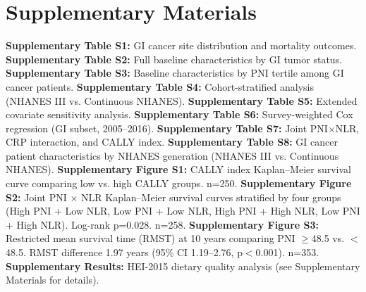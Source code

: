 \documentclass[review]{elsarticle}
\begin{document}
\section*{Supplementary Materials}

\textbf{Supplementary Table S1:} GI cancer site distribution and mortality outcomes.
\textbf{Supplementary Table S2:} Full baseline characteristics by GI tumor status.
\textbf{Supplementary Table S3:} Baseline characteristics by PNI tertile among GI cancer patients.
\textbf{Supplementary Table S4:} Cohort-stratified analysis (NHANES III vs. Continuous NHANES).
\textbf{Supplementary Table S5:} Extended covariate sensitivity analysis.
\textbf{Supplementary Table S6:} Survey-weighted Cox regression (GI subset, 2005--2016).
\textbf{Supplementary Table S7:} Joint PNI$\times$NLR, CRP interaction, and CALLY index.
\textbf{Supplementary Table S8:} GI cancer patient characteristics by NHANES generation (NHANES III vs. Continuous NHANES).
\textbf{Supplementary Figure S1:} CALLY index Kaplan--Meier survival curve comparing low vs. high CALLY groups. n=250.
\textbf{Supplementary Figure S2:} Joint PNI $\times$ NLR Kaplan--Meier survival curves stratified by four groups (High PNI + Low NLR, Low PNI + Low NLR, High PNI + High NLR, Low PNI + High NLR). Log-rank p=0.028. n=258.
\textbf{Supplementary Figure S3:} Restricted mean survival time (RMST) at 10 years comparing PNI $\ge$48.5 vs. $<$48.5. RMST difference 1.97 years (95\% CI 1.19--2.76, p$<$0.001). n=353.
\textbf{Supplementary Results:} HEI-2015 dietary quality analysis (see Supplementary Materials for details).



\end{document}

